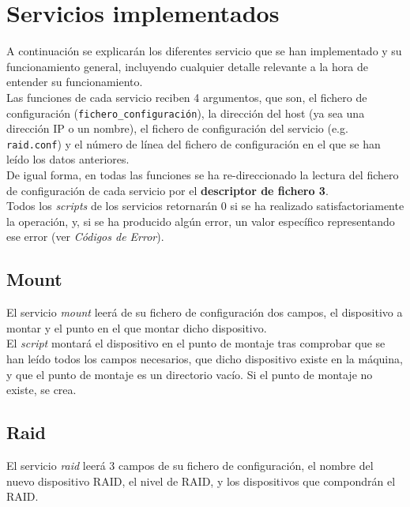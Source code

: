 \documentclass[12pt,a4paper, spanish]{article}
\begin{document}
\section{Servicios implementados}
\noindent A continuación se explicarán los diferentes servicio que se han implementado y su funcionamiento general, incluyendo cualquier detalle relevante a la hora de entender su funcionamiento.\\

Las funciones de cada servicio reciben 4 argumentos, que son, el fichero de configuración (\texttt{fichero\_configuración}), la dirección del host (ya sea una dirección IP o un nombre), el fichero de configuración del servicio (e.g. \texttt{raid.conf}) y el número de línea del fichero de configuración en el que se han leído los datos anteriores.\\

De igual forma, en todas las funciones se ha re-direccionado la lectura del fichero de configuración de cada servicio por el \textbf{descriptor de fichero 3}.\\

Todos los \textit{scripts} de los servicios retornarán 0 si se ha realizado satisfactoriamente la operación, y, si se ha producido algún error, un valor específico representando ese error (ver \textit{Códigos de Error}).


\subsection{Mount}
\noindent El servicio \textit{mount} leerá de su fichero de configuración dos campos, el dispositivo a montar y el punto en el que montar dicho dispositivo.\\

El \textit{script} montará el dispositivo en el punto de montaje tras comprobar que se han leído todos los campos necesarios, que dicho dispositivo existe en la máquina, y que el punto de montaje es un directorio vacío. Si el punto de montaje no existe, se crea.\\


\subsection{Raid}
\noindent El servicio \textit{raid} leerá 3 campos de su fichero de configuración, el nombre del nuevo dispositivo RAID, el nivel de RAID, y los dispositivos que compondrán el RAID.\\
\end{document}
